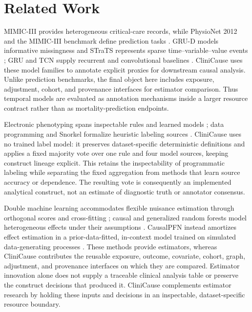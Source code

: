 \documentclass[letterpaper]{article}
\begin{document}
\section{Related Work}

MIMIC-III provides heterogeneous critical-care records, while PhysioNet 2012
and the MIMIC-III benchmark define prediction tasks
\cite{johnson2016mimiciii,silva2012physionet,
harutyunyan_2019_mimiciii_benchmark}. GRU-D models informative missingness and
STraTS represents sparse time--variable--value events
\cite{che2018grud,tipirneni2022strats}; GRU and TCN supply recurrent and
convolutional baselines \cite{cho2014gru,bai2018tcn}. CliniCause uses these
model families to annotate explicit proxies for downstream causal analysis.
Unlike prediction benchmarks, the final object here includes exposure,
adjustment, cohort, and provenance interfaces for estimator comparison.
Thus temporal models are evaluated as annotation mechanisms inside a larger
resource contract rather than as mortality-prediction endpoints.

Electronic phenotyping spans inspectable rules and learned models
\cite{banda_2018_electronic_phenotyping}; data programming and Snorkel formalize
heuristic labeling sources \cite{ratner_et_al_2016_data_programming,
ratner_et_al_2020_snorkel}. CliniCause uses no trained label model: it preserves
dataset-specific deterministic definitions and applies a fixed majority vote
over one rule and four model sources, keeping construct lineage explicit. This
retains the inspectability of programmatic labeling while separating the fixed
aggregation from methods that learn source accuracy or dependence.
The resulting vote is consequently an implemented analytical construct, not an
estimate of diagnostic truth or annotator consensus.

Double machine learning accommodates flexible nuisance estimation through
orthogonal scores and cross-fitting \cite{chernozhukov2018dml}; causal and
generalized random forests model heterogeneous effects under their assumptions
\cite{wager2018causalforest,athey2019grf}. CausalPFN instead amortizes effect
estimation in a prior-data-fitted, in-context model trained on simulated
data-generating processes \cite{balazadeh2025causalpfn}. These methods provide
estimators, whereas CliniCause contributes the reusable exposure, outcome,
covariate, cohort, graph, adjustment, and provenance interfaces on which they
are compared. Estimator innovation alone does not supply a traceable clinical
analysis table or preserve the construct decisions that produced it.
CliniCause complements estimator research by holding these inputs and decisions
in an inspectable, dataset-specific resource boundary.
\end{document}
